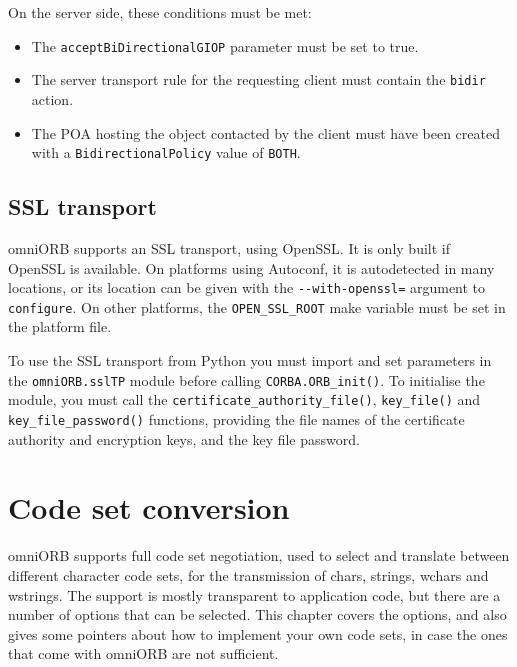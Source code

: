 \documentclass[draft,11pt,twoside,a4paper]{book}
\newcommand{\code}[1]{\texttt{#1}}
\newcommand{\op}[1]{\texttt{#1()}}
\begin{document}
\noindent On the server side, these conditions must be met:

\begin{itemize}

\item The \code{acceptBiDirectionalGIOP} parameter must be set to true. 
\item The server transport rule for the requesting client must contain
      the \code{bidir} action.
\item The POA hosting the object contacted by the client must have
      been created with a \code{BidirectionalPolicy} value of
      \code{BOTH}.

\end{itemize}


\section{SSL transport}

omniORB supports an SSL transport, using OpenSSL. It is only built if
OpenSSL is available. On platforms using Autoconf, it is autodetected
in many locations, or its location can be given with the
\code{-{}-with-openssl=} argument to \code{configure}. On other
platforms, the \code{OPEN\_SSL\_ROOT} make variable must be set in the
platform file.

To use the SSL transport from Python you must import and set
parameters in the \code{omniORB.sslTP} module before calling
\op{CORBA.ORB\_init}. To initialise the module, you must call the
\op{certificate\_authority\_file}, \op{key\_file} and
\op{key\_file\_password} functions, providing the file names of the
certificate authority and encryption keys, and the key file password.






\chapter{Code set conversion}
\label{chap:codesets}

omniORB supports full code set negotiation, used to select and
translate between different character code sets, for the transmission
of chars, strings, wchars and wstrings. The support is mostly
transparent to application code, but there are a number of options
that can be selected. This chapter covers the options, and also gives
some pointers about how to implement your own code sets, in case the
ones that come with omniORB are not sufficient.
\end{document}
